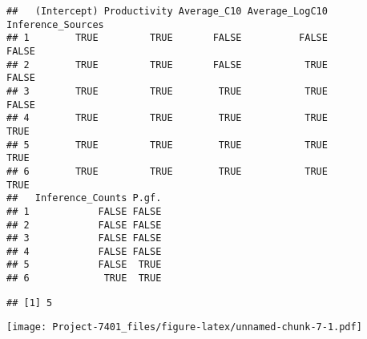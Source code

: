 \documentclass[
]{article}
\newenvironment{Shaded}{\begin{snugshade}}{\end{snugshade}}
\newcommand{\AttributeTok}[1]{\textcolor[rgb]{0.13,0.29,0.53}{#1}}
\newcommand{\CommentTok}[1]{\textcolor[rgb]{0.56,0.35,0.01}{\textit{#1}}}
\newcommand{\DecValTok}[1]{\textcolor[rgb]{0.00,0.00,0.81}{#1}}
\newcommand{\FunctionTok}[1]{\textcolor[rgb]{0.13,0.29,0.53}{\textbf{#1}}}
\newcommand{\NormalTok}[1]{#1}
\newcommand{\SpecialCharTok}[1]{\textcolor[rgb]{0.81,0.36,0.00}{\textbf{#1}}}
\newcommand{\StringTok}[1]{\textcolor[rgb]{0.31,0.60,0.02}{#1}}
\begin{document}
\begin{verbatim}
##   (Intercept) Productivity Average_C10 Average_LogC10 Inference_Sources
## 1        TRUE         TRUE       FALSE          FALSE             FALSE
## 2        TRUE         TRUE       FALSE           TRUE             FALSE
## 3        TRUE         TRUE        TRUE           TRUE             FALSE
## 4        TRUE         TRUE        TRUE           TRUE              TRUE
## 5        TRUE         TRUE        TRUE           TRUE              TRUE
## 6        TRUE         TRUE        TRUE           TRUE              TRUE
##   Inference_Counts P.gf.
## 1            FALSE FALSE
## 2            FALSE FALSE
## 3            FALSE FALSE
## 4            FALSE FALSE
## 5            FALSE  TRUE
## 6             TRUE  TRUE
\end{verbatim}

\begin{Shaded}
\end{Shaded}

\begin{verbatim}
## [1] 5
\end{verbatim}

\begin{Shaded}
\end{Shaded}

\texttt{[image: Project-7401\_files/figure-latex/unnamed-chunk-7-1.pdf]}
\end{document}
